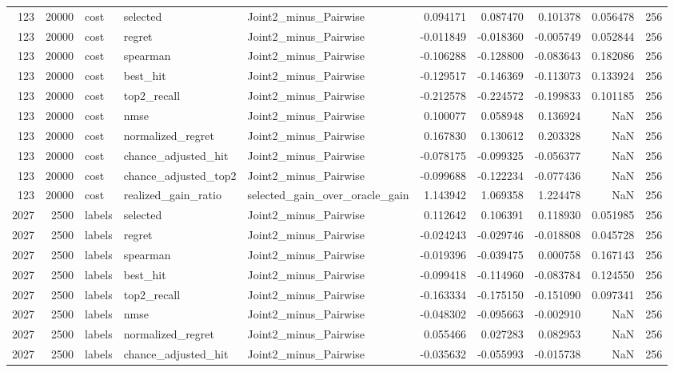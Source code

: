 \begin{tabular}{rrlllrrrrr}
123 & 20000 & cost & selected & Joint2_minus_Pairwise & 0.094171 & 0.087470 & 0.101378 & 0.056478 & 256 \\
123 & 20000 & cost & regret & Joint2_minus_Pairwise & -0.011849 & -0.018360 & -0.005749 & 0.052844 & 256 \\
123 & 20000 & cost & spearman & Joint2_minus_Pairwise & -0.106288 & -0.128800 & -0.083643 & 0.182086 & 256 \\
123 & 20000 & cost & best_hit & Joint2_minus_Pairwise & -0.129517 & -0.146369 & -0.113073 & 0.133924 & 256 \\
123 & 20000 & cost & top2_recall & Joint2_minus_Pairwise & -0.212578 & -0.224572 & -0.199833 & 0.101185 & 256 \\
123 & 20000 & cost & nmse & Joint2_minus_Pairwise & 0.100077 & 0.058948 & 0.136924 & NaN & 256 \\
123 & 20000 & cost & normalized_regret & Joint2_minus_Pairwise & 0.167830 & 0.130612 & 0.203328 & NaN & 256 \\
123 & 20000 & cost & chance_adjusted_hit & Joint2_minus_Pairwise & -0.078175 & -0.099325 & -0.056377 & NaN & 256 \\
123 & 20000 & cost & chance_adjusted_top2 & Joint2_minus_Pairwise & -0.099688 & -0.122234 & -0.077436 & NaN & 256 \\
123 & 20000 & cost & realized_gain_ratio & selected_gain_over_oracle_gain & 1.143942 & 1.069358 & 1.224478 & NaN & 256 \\
2027 & 2500 & labels & selected & Joint2_minus_Pairwise & 0.112642 & 0.106391 & 0.118930 & 0.051985 & 256 \\
2027 & 2500 & labels & regret & Joint2_minus_Pairwise & -0.024243 & -0.029746 & -0.018808 & 0.045728 & 256 \\
2027 & 2500 & labels & spearman & Joint2_minus_Pairwise & -0.019396 & -0.039475 & 0.000758 & 0.167143 & 256 \\
2027 & 2500 & labels & best_hit & Joint2_minus_Pairwise & -0.099418 & -0.114960 & -0.083784 & 0.124550 & 256 \\
2027 & 2500 & labels & top2_recall & Joint2_minus_Pairwise & -0.163334 & -0.175150 & -0.151090 & 0.097341 & 256 \\
2027 & 2500 & labels & nmse & Joint2_minus_Pairwise & -0.048302 & -0.095663 & -0.002910 & NaN & 256 \\
2027 & 2500 & labels & normalized_regret & Joint2_minus_Pairwise & 0.055466 & 0.027283 & 0.082953 & NaN & 256 \\
2027 & 2500 & labels & chance_adjusted_hit & Joint2_minus_Pairwise & -0.035632 & -0.055993 & -0.015738 & NaN & 256 \\

\end{tabular}
